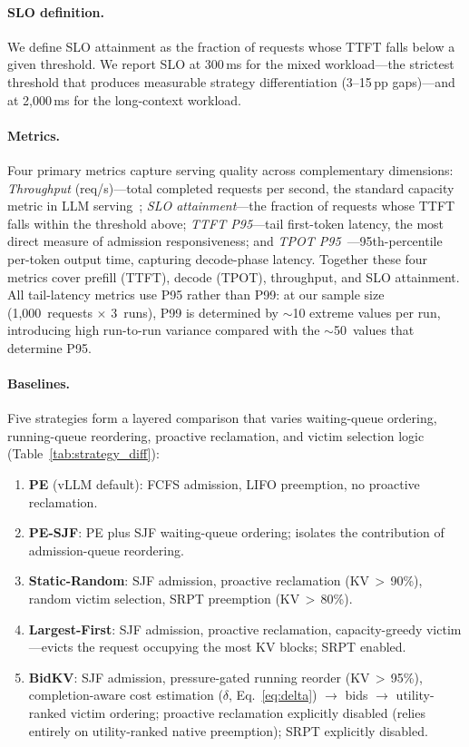 \documentclass[sigconf,nonacm]{acmart}
\newcommand{\bidkv}{BidKV\xspace}
\newcommand{\qualdelta}{\ensuremath{\delta}}
\begin{document}
\paragraph{SLO definition.}
We define SLO attainment as the fraction of requests whose TTFT falls below
a given threshold.  We report SLO at 300\,ms for the mixed workload---the
strictest threshold that produces measurable strategy differentiation
(3--15\,pp gaps)---and at 2{,}000\,ms for the long-context workload.

\paragraph{Metrics.}
Four primary metrics capture serving quality across complementary dimensions:
\emph{Throughput} (req/s)---total completed requests per second, the standard
capacity metric in LLM serving~\cite{Kwon2023, Yu2022, Zheng2024sglang};
\emph{SLO attainment}---the fraction of requests whose
TTFT falls within the threshold above;
\emph{TTFT P95}---tail first-token latency, the most direct measure of
admission responsiveness;
and \emph{TPOT P95}~\cite{Agrawal2024sarathiserve}---95th-percentile per-token
output time, capturing decode-phase latency.
Together these four metrics cover prefill (TTFT), decode (TPOT), throughput, and
SLO attainment.
All tail-latency metrics use P95 rather than P99: at our sample size
(1{,}000~requests $\times$ 3~runs), P99 is determined by ${\sim}$10 extreme
values per run, introducing high run-to-run variance compared with the
${\sim}$50~values that determine P95.

\paragraph{Baselines.}
Five strategies form a layered comparison that varies waiting-queue ordering,
running-queue reordering, proactive reclamation, and victim selection logic
(Table~\ref{tab:strategy_diff}):
\begin{enumerate}[nosep]
\item \textbf{PE} (vLLM default): FCFS admission, LIFO preemption, no
  proactive reclamation.
\item \textbf{PE-SJF}: PE plus SJF waiting-queue ordering; isolates the
  contribution of admission-queue reordering.
\item \textbf{Static-Random}: SJF admission, proactive reclamation
  (KV\,$>$\,90\%), random victim selection, SRPT preemption
  (KV\,$>$\,80\%).
\item \textbf{Largest-First}: SJF admission, proactive reclamation,
  capacity-greedy victim---evicts the request occupying the most KV blocks;
  SRPT enabled.
\item \textbf{\bidkv}: SJF admission, pressure-gated running reorder
  (KV\,$>$\,95\%), completion-aware cost estimation
  ($\qualdelta$, Eq.~\ref{eq:delta}) $\to$ bids $\to$ utility-ranked
  victim ordering; proactive reclamation explicitly disabled
  (relies entirely on utility-ranked native preemption);
  SRPT explicitly disabled.
\end{enumerate}
\end{document}
